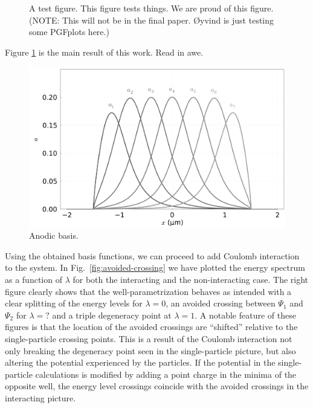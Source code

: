 \documentclass[twocolumn,superscriptaddress,unsortedaddress,
 amsmath,amssymb,
 aps,
]{revtex4-2}
\begin{document}
    

    \begin{figure}
        
        \caption{\label{fig:test} A test figure. This figure tests things. We are proud of this figure. (NOTE: This will not be in the final paper. Øyvind is just testing some PGFplots here.)}
    \end{figure}
    Figure \ref{fig:test} is the main result of this work. Read in awe.

    \begin{figure}
        \includegraphics[width=\columnwidth]{figures/figure1_as.pdf}
        \caption{\label{fig:anodes}Anodic basis.}
    \end{figure}

    Using the obtained basis functions, we can proceed to add Coulomb interaction to the system.
    In Fig.~\ref{fig:avoided-crossing} we have plotted the energy spectrum as a function of $\lambda$ for both
    the interacting and the non-interacting case. The right figure clearly shows that the well-parametrization behaves as intended with a clear splitting of the energy levels for $\lambda = 0$, an avoided crossing between $\Psi_1$ and $\Psi_2$ for $\lambda = ?$ and a triple degeneracy point at $\lambda = 1$. %
    A notable feature of these figures is that the location of the avoided crossings are ``shifted''
    relative to the single-particle crossing points.
    This is a result of the Coulomb interaction not only breaking the degeneracy point seen in the
    single-particle picture, but also altering the potential experienced by the particles. If the potential in the single-particle calculations is modified by adding a point charge in the minima of the opposite well, the energy level crossings coincide with the avoided crossings in the interacting picture.
\end{document}
